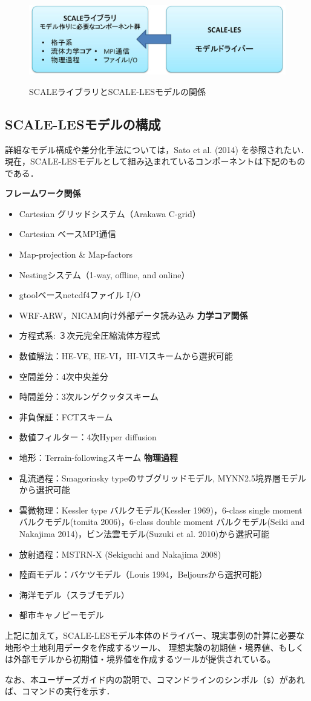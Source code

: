 \begin{figure}[t]
\begin{center}
  \includegraphics[width=0.9\hsize]{./figure/scale_and_scale-les.eps}\\
  \caption{SCALEライブラリとSCALE-LESモデルの関係}
  \label{fig:scale-les}
\end{center}
\end{figure}


\subsection{SCALE-LESモデルの構成}
詳細なモデル構成や差分化手法については，Sato et al. (2014) を参照されたい．
現在，SCALE-LESモデルとして組み込まれているコンポーネントは下記のものである．

{\bf フレームワーク関係}
\begin{itemize}
\item Cartesian グリッドシステム（Arakawa C-grid）
\item Cartesian ベースMPI通信
\item Map-projection \& Map-factors
\item Nestingシステム（1-way, offline, and online）
\item gtoolベースnetcdf4ファイル I/O
\item WRF-ARW，NICAM向け外部データ読み込み
{\bf 力学コア関係}
\item 方程式系: ３次元完全圧縮流体方程式
\item 数値解法：HE-VE,  HE-VI，HI-VIスキームから選択可能
\item 空間差分：4次中央差分
\item 時間差分：3次ルンゲクッタスキーム
\item 非負保証：FCTスキーム
\item 数値フィルター：4次Hyper diffusion
\item 地形：Terrain-followingスキーム
{\bf 物理過程}
\item 乱流過程：Smagorinsky typeのサブグリッドモデル, MYNN2.5境界層モデルから選択可能
\item 雲微物理：Kessler type バルクモデル(Kessler 1969)，6-class single moment バルクモデル(tomita 2006)，6-class double moment バルクモデル(Seiki and Nakajima 2014)，ビン法雲モデル(Suzuki et al. 2010)から選択可能
\item 放射過程：MSTRN-X (Sekiguchi and Nakajima 2008)
\item 陸面モデル：バケツモデル（Louis 1994，Beljoursから選択可能）
\item 海洋モデル（スラブモデル）
\item 都市キャノピーモデル
\end{itemize}

上記に加えて，SCALE-LESモデル本体のドライバー、現実事例の計算に必要な地形や土地利用データを作成するツール、
理想実験の初期値・境界値、もしくは外部モデルから初期値・境界値を作成するツールが提供されている。

なお、本ユーザーズガイド内の説明で、コマンドラインのシンボル（\verb|$|）があれば、コマンドの実行を示す．
